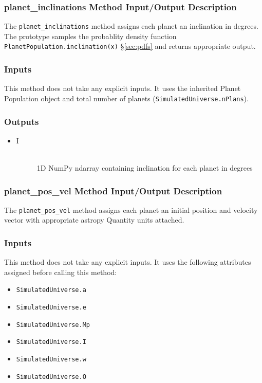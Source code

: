 \documentclass[cleanfoot]{asme2ej}
\begin{document}
\subsubsection{planet\_inclinations Method Input/Output Description} \label{sec:planetinclinationstask}
The \verb+planet_inclinations+ method assigns each planet an inclination in degrees. The prototype samples the probablity density function \verb+PlanetPopulation.inclination(x)+ \S\ref{sec:pdfs} and returns appropriate output.

\subsubsection*{Inputs}
This method does not take any explicit inputs.  It uses the inherited Planet Population object and total number of planets (\verb+SimulatedUniverse.nPlans+).

\subsubsection*{Outputs}
\begin{itemize}
    \item 
    \begin{description}
        \item[I] \hfill \\
        1D NumPy ndarray containing inclination for each planet in degrees 
    \end{description}
\end{itemize}

\subsubsection{planet\_pos\_vel Method Input/Output Description} \label{sec:planetposveltask}
The \verb+planet_pos_vel+ method assigns each planet an initial position and velocity vector with appropriate astropy Quantity units attached.

\subsubsection*{Inputs}
This method does not take any explicit inputs.  It uses the following attributes assigned before calling this method:
\begin{itemize}
    \item \verb+SimulatedUniverse.a+
    \item \verb+SimulatedUniverse.e+
    \item \verb+SimulatedUniverse.Mp+
    \item \verb+SimulatedUniverse.I+
    \item \verb+SimulatedUniverse.w+
    \item \verb+SimulatedUniverse.O+
\end{itemize}
\end{document}
